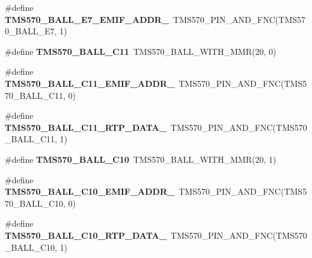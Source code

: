 \begin{DoxyCompactItemize}
\mbox{\label{tms570ls3137zwt-pins_8h_ad7c230ce9147aecbd0b827e70fc0fef5}} 
\#define {\bfseries T\+M\+S570\+\_\+\+B\+A\+L\+L\+\_\+\+E7\+\_\+\+E\+M\+I\+F\+\_\+\+A\+D\+D\+R\+\_}~T\+M\+S570\+\_\+\+P\+I\+N\+\_\+\+A\+N\+D\+\_\+\+F\+NC(T\+M\+S570\+\_\+\+B\+A\+L\+L\+\_\+\+E7, 1)
\item 
\mbox{\label{tms570ls3137zwt-pins_8h_acf7724683b6767fa0009bee27d2a28c1}} 
\#define {\bfseries T\+M\+S570\+\_\+\+B\+A\+L\+L\+\_\+\+C11}~T\+M\+S570\+\_\+\+B\+A\+L\+L\+\_\+\+W\+I\+T\+H\+\_\+\+M\+MR(20, 0)
\item 
\mbox{\label{tms570ls3137zwt-pins_8h_a68af8a8d173b37d119594c211d2e83d3}} 
\#define {\bfseries T\+M\+S570\+\_\+\+B\+A\+L\+L\+\_\+\+C11\+\_\+\+E\+M\+I\+F\+\_\+\+A\+D\+D\+R\+\_}~T\+M\+S570\+\_\+\+P\+I\+N\+\_\+\+A\+N\+D\+\_\+\+F\+NC(T\+M\+S570\+\_\+\+B\+A\+L\+L\+\_\+\+C11, 0)
\item 
\mbox{\label{tms570ls3137zwt-pins_8h_ab2abd75074a374446aa08c72b70ac46c}} 
\#define {\bfseries T\+M\+S570\+\_\+\+B\+A\+L\+L\+\_\+\+C11\+\_\+\+R\+T\+P\+\_\+\+D\+A\+T\+A\+\_}~T\+M\+S570\+\_\+\+P\+I\+N\+\_\+\+A\+N\+D\+\_\+\+F\+NC(T\+M\+S570\+\_\+\+B\+A\+L\+L\+\_\+\+C11, 1)
\item 
\mbox{\label{tms570ls3137zwt-pins_8h_a6a5bae7c0506088cb1d3a484e8f5ad7b}} 
\#define {\bfseries T\+M\+S570\+\_\+\+B\+A\+L\+L\+\_\+\+C10}~T\+M\+S570\+\_\+\+B\+A\+L\+L\+\_\+\+W\+I\+T\+H\+\_\+\+M\+MR(20, 1)
\item 
\mbox{\label{tms570ls3137zwt-pins_8h_a712e40ba4ffa418e88c0d1fc4ee0580f}} 
\#define {\bfseries T\+M\+S570\+\_\+\+B\+A\+L\+L\+\_\+\+C10\+\_\+\+E\+M\+I\+F\+\_\+\+A\+D\+D\+R\+\_}~T\+M\+S570\+\_\+\+P\+I\+N\+\_\+\+A\+N\+D\+\_\+\+F\+NC(T\+M\+S570\+\_\+\+B\+A\+L\+L\+\_\+\+C10, 0)
\item 
\mbox{\label{tms570ls3137zwt-pins_8h_af3503ff8899a3c8e5084845d23c3a329}} 
\#define {\bfseries T\+M\+S570\+\_\+\+B\+A\+L\+L\+\_\+\+C10\+\_\+\+R\+T\+P\+\_\+\+D\+A\+T\+A\+\_}~T\+M\+S570\+\_\+\+P\+I\+N\+\_\+\+A\+N\+D\+\_\+\+F\+NC(T\+M\+S570\+\_\+\+B\+A\+L\+L\+\_\+\+C10, 1)
\item 

\end{DoxyCompactItemize}
